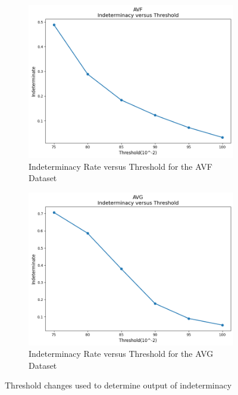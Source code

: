 \begin{figure}[H]
    \centering
    \begin{subfigure}[b]{0.5\textwidth}
        \centering
        \includegraphics[width=\linewidth]{figures/AVF_Threshold changes used to determine output of indeterminacy.png}
        \caption{Indeterminacy Rate versus Threshold for the AVF Dataset}
        \label{fig:vascular-access}
    \end{subfigure}%
    \hfill
    \begin{subfigure}[b]{0.5\textwidth}
        \centering
        \includegraphics[width=\linewidth]{figures/AVG_Threshold changes used to determine output of indeterminacy.png}
        \caption{Indeterminacy Rate versus Threshold for the AVG Dataset}
        \label{fig:pta-symptom}
    \end{subfigure}
    \caption{Threshold changes used to determine output of indeterminacy}
    \label{fig:combined}
\end{figure}

